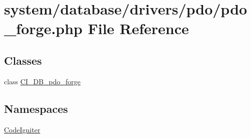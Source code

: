 \hypertarget{pdo__forge_8php}{}\section{system/database/drivers/pdo/pdo\+\_\+forge.php File Reference}
\label{pdo__forge_8php}
\subsection*{Classes}
\begin{DoxyCompactItemize}
\item 
class \mbox{\hyperlink{class_c_i___d_b__pdo__forge}{C\+I\+\_\+\+D\+B\+\_\+pdo\+\_\+forge}}
\end{DoxyCompactItemize}
\subsection*{Namespaces}
\begin{DoxyCompactItemize}
\item 
 \mbox{\hyperlink{namespace_code_igniter}{Code\+Igniter}}
\end{DoxyCompactItemize}

